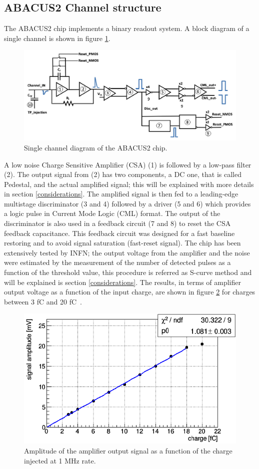 \subsection{ABACUS2 Channel structure}
The ABACUS2 chip implements a binary readout system.
A block diagram of a single channel is shown in figure \ref{fig:abacuschannel}.
\begin{figure}[H]
	\centering
	\includegraphics[width=0.8\linewidth]{IMG/ch2/Abacus_channel.png}
	\caption{Single channel diagram of the ABACUS2 chip.}
	\label{fig:abacuschannel}
\end{figure}
\noindent A low noise Charge Sensitive Amplifier (CSA) (1) is followed by a low-pass filter (2).
The output signal from (2) has two components, a DC one, that is called Pedestal, and the actual amplified signal; this will be explained with more details in section \ref{considerations}.
The amplified signal is then fed to a leading-edge multistage discriminator (3 and 4) followed by a driver (5 and 6) which provides a logic pulse in Current Mode Logic (CML) format.
The output of the discriminator is also used in a feedback circuit (7 and 8) to reset the CSA feedback capacitance.
This feedback circuit was designed for a fast baseline restoring and to avoid signal saturation (fast-reset signal).
The chip has been extensively tested by INFN; the output voltage from the amplifier and the noise were estimated by the measurement of the number of detected pulses as a function of the threshold value, this procedure is referred as S-curve method and will be explained is section \ref{considerations}.
The results, in terms of amplifier output voltage as a function of the input charge, are shown in figure \ref{fig:abacustest} for charges between 3 fC and 20 fC~\cite{abacus}.
\begin{figure}[H]
	\centering
	\includegraphics[width=0.7\linewidth]{IMG/ch2/ABACUSTEST}
	\caption{Amplitude of the amplifier output signal as a function of the charge injected at 1 MHz rate.}
	\label{fig:abacustest}
\end{figure}
